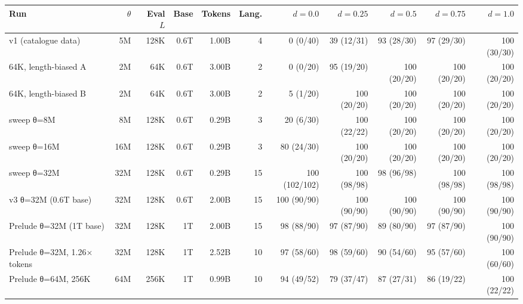 \begin{tabular}{lrrrrrrrrrr}
\toprule
Run & $\theta$ & Eval $L$ & Base & Tokens & Lang. & $d=0.0$ & $d=0.25$ & $d=0.5$ & $d=0.75$ & $d=1.0$ \\
\midrule
v1 (catalogue data) & 5M & 128K & 0.6T & 1.00B & 4 & 0 (0/40) & 39 (12/31) & 93 (28/30) & 97 (29/30) & 100 (30/30) \\
64K, length-biased A & 2M & 64K & 0.6T & 3.00B & 2 & 0 (0/20) & 95 (19/20) & 100 (20/20) & 100 (20/20) & 100 (20/20) \\
64K, length-biased B & 2M & 64K & 0.6T & 3.00B & 2 & 5 (1/20) & 100 (20/20) & 100 (20/20) & 100 (20/20) & 100 (20/20) \\
sweep θ=8M & 8M & 128K & 0.6T & 0.29B & 3 & 20 (6/30) & 100 (22/22) & 100 (20/20) & 100 (20/20) & 100 (20/20) \\
sweep θ=16M & 16M & 128K & 0.6T & 0.29B & 3 & 80 (24/30) & 100 (20/20) & 100 (20/20) & 100 (20/20) & 100 (20/20) \\
sweep θ=32M & 32M & 128K & 0.6T & 0.29B & 15 & 100 (102/102) & 100 (98/98) & 98 (96/98) & 100 (98/98) & 100 (98/98) \\
v3 θ=32M (0.6T base) & 32M & 128K & 0.6T & 2.00B & 15 & 100 (90/90) & 100 (90/90) & 100 (90/90) & 100 (90/90) & 100 (90/90) \\
Prelude θ=32M (1T base) & 32M & 128K & 1T & 2.00B & 15 & 98 (88/90) & 97 (87/90) & 89 (80/90) & 97 (87/90) & 100 (90/90) \\
Prelude θ=32M, 1.26× tokens & 32M & 128K & 1T & 2.52B & 10 & 97 (58/60) & 98 (59/60) & 90 (54/60) & 95 (57/60) & 100 (60/60) \\
Prelude θ=64M, 256K & 64M & 256K & 1T & 0.99B & 10 & 94 (49/52) & 79 (37/47) & 87 (27/31) & 86 (19/22) & 100 (22/22) \\
\bottomrule
\end{tabular}
